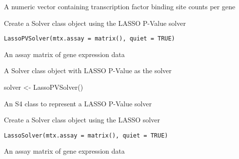 \documentclass[a4paper]{book}
\begin{document}
%
\begin{Value}
A numeric vector containing transcription factor binding site counts per gene
\end{Value}
%
\begin{Description}\relax
Create a Solver class object using the LASSO P-Value solver
\end{Description}
%
\begin{Usage}
\begin{verbatim}
LassoPVSolver(mtx.assay = matrix(), quiet = TRUE)
\end{verbatim}
\end{Usage}
%
\begin{Arguments}
\begin{ldescription}
\item[\code{mtx.assay}] An assay matrix of gene expression data
\end{ldescription}
\end{Arguments}
%
\begin{Value}
A Solver class object with LASSO P-Value as the solver
\end{Value}
%
\begin{Examples}
\begin{ExampleCode}
solver <- LassoPVSolver()
\end{ExampleCode}
\end{Examples}
%
\begin{Description}\relax
An S4 class to represent a LASSO P-Value solver
\end{Description}
%
\begin{Description}\relax
Create a Solver class object using the LASSO solver
\end{Description}
%
\begin{Usage}
\begin{verbatim}
LassoSolver(mtx.assay = matrix(), quiet = TRUE)
\end{verbatim}
\end{Usage}
%
\begin{Arguments}
\begin{ldescription}
\item[\code{mtx.assay}] An assay matrix of gene expression data
\end{ldescription}
\end{Arguments}
\end{document}
